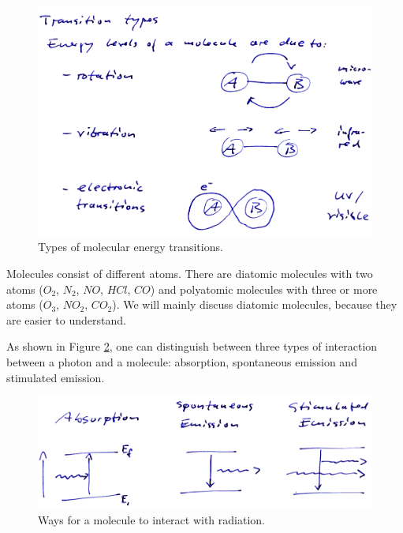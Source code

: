\begin{figure}
  \centering
  \includegraphics[width=\hsize]{figures/transition_types}
  \caption{Types of molecular energy transitions.}
  \label{fig:transition_types}
\end{figure}

Molecules consist of different atoms. There are diatomic molecules with two
atoms ($O_2$, $N_2$, $NO$, $HCl$, $CO$) and polyatomic molecules with
three or more atoms ($O_3$, $NO_2$, $CO_2$). We will mainly discuss
diatomic molecules, because they are easier to understand.

As shown in Figure \ref{fig:interaction_types}, one can distinguish
between three types of interaction between a photon and a molecule:
absorption, spontaneous emission and stimulated emission.

\begin{figure}
  \centering
  \includegraphics[width=\hsize]{figures/interaction_types}
  \caption{Ways for a molecule to interact with radiation.}
  \label{fig:interaction_types}
\end{figure}

